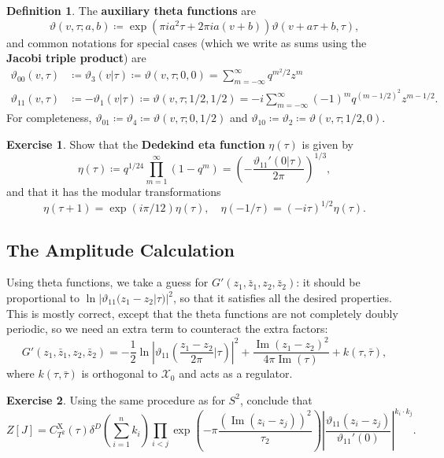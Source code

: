 \documentclass{report}
\theoremstyle{plain}
\theoremstyle{definition}
\newtheorem{definition}[theorem]{Definition}
\newtheorem{exercise}{Exercise}[section]
\theoremstyle{remark}
\newcommand{\cX}{\mathcal{X}}
\DeclareMathOperator{\im}{Im}
\newcommand{\bz}{\bar{z}}
\begin{document}
\begin{definition}
  The {\bf auxiliary theta functions} are
  \[ \vartheta(v, \tau; a, b) \coloneqq \exp\left(\pi i a^2\tau + 2\pi ia(v + b)\right)\vartheta(v + a\tau + b, \tau), \]
  and common notations for special cases (which we write as sums using
  the {\bf Jacobi triple product}) are
  \begin{align*}
    \vartheta_{00}(v, \tau) &\coloneqq \vartheta_3(v|\tau) \coloneqq \vartheta(v, \tau; 0, 0) = \sum_{m=-\infty}^\infty q^{m^2/2} z^m \\
    \vartheta_{11}(v, \tau) &\coloneqq -\vartheta_1(v|\tau) \coloneqq \vartheta(v, \tau; 1/2, 1/2) = -i\sum_{m=-\infty}^\infty (-1)^m q^{(m-1/2)^2} z^{m-1/2}.
  \end{align*}
  For completeness, $\vartheta_{01} \coloneqq \vartheta_4 \coloneqq
  \vartheta(v, \tau; 0, 1/2)$ and $\vartheta_{10} \coloneqq
  \vartheta_2 \coloneqq \vartheta(v, \tau; 1/2, 0)$.
\end{definition}

\begin{exercise}
  Show that the {\bf Dedekind eta function} $\eta(\tau)$ is given by
  \[ \eta(\tau) \coloneqq q^{1/24} \prod_{m=1}^\infty (1 - q^m) = \left(-\frac{\vartheta_{11}'(0 | \tau)}{2\pi}\right)^{1/3}, \]
  and that it has the modular transformations
  \[ \eta(\tau + 1) = \exp(i\pi/12)\eta(\tau), \quad \eta(-1/\tau) = (-i\tau)^{1/2} \eta(\tau). \]
\end{exercise}

\subsection{The Amplitude Calculation}

Using theta functions, we take a guess for $G'(z_1, \bz_1, z_2,
\bz_2)$: it should be proportional to $\ln |\vartheta_{11}(z_1 - z_2 |
\tau)|^2$, so that it satisfies all the desired properties. This is
mostly correct, except that the theta functions are not completely
doubly periodic, so we need an extra term to counteract the extra
factors:
\[ G'(z_1, \bz_1, z_2, \bz_2) = -\frac{1}{2} \ln\left|\vartheta_{11}\left(\frac{z_1 - z_2}{2\pi} \big| \tau\right)\right|^2 + \frac{\im(z_1 - z_2)^2}{4\pi \im(\tau)} + k(\tau,\bar{\tau}), \]
where $k(\tau, \bar{\tau})$ is orthogonal to $\cX_0$ and acts as a
regulator.

\begin{exercise}
  Using the same procedure as for $S^2$, conclude that
  \[ Z[J] = C_{T^2}^{\text{X}}(\tau) \delta^D\left(\sum_{i=1}^n k_i\right) \prod_{i<j} \exp\left(-\pi \frac{(\im (z_i - z_j))^2}{\tau_2}\right) \left|\frac{\vartheta_{11}(z_i - z_j)}{\vartheta_{11}'(0)}\right|^{k_i \cdot k_j}. \]
\end{exercise}
\end{document}
